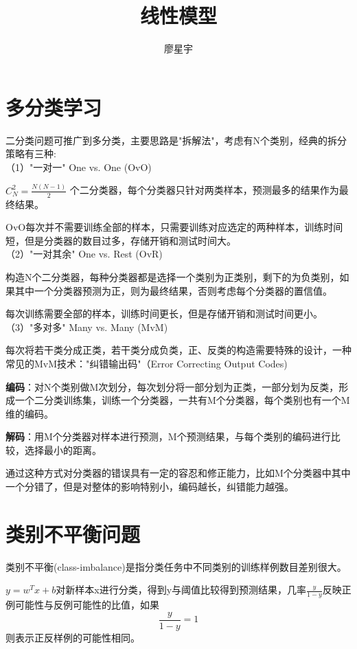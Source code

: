 \documentclass[UTF8]{article}
\author {廖星宇}
\title {线性模型}
\begin{document}
\maketitle
\section{多分类学习}

二分类问题可推广到多分类，主要思路是"拆解法"，考虑有N个类别，经典的拆分策略有三种:\\

（1）"一对一" One vs. One (OvO)

$C_{N}^{2} = \frac{N(N-1)}{2}$ 个二分类器，每个分类器只针对两类样本，预测最多的结果作为最终结果。

OvO每次并不需要训练全部的样本，只需要训练对应选定的两种样本，训练时间短，但是分类器的数目过多，存储开销和测试时间大。\\

（2）"一对其余" One vs. Rest (OvR)

构造N个二分类器，每种分类器都是选择一个类别为正类别，剩下的为负类别，如果其中一个分类器预测为正，则为最终结果，否则考虑每个分类器的置信值。

每次训练需要全部的样本，训练时间更长，但是存储开销和测试时间更小。\\

（3）"多对多" Many vs. Many (MvM)

每次将若干类分成正类，若干类分成负类，正、反类的构造需要特殊的设计，一种常见的MvM技术："纠错输出码"（Error Correcting Output Codes)

\textbf{编码}：对N个类别做M次划分，每次划分将一部分划为正类，一部分划为反类，形成一个二分类训练集，训练一个分类器，一共有M个分类器，每个类别也有一个M维的编码。

\textbf{解码}：用M个分类器对样本进行预测，M个预测结果，与每个类别的编码进行比较，选择最小的距离。

通过这种方式对分类器的错误具有一定的容忍和修正能力，比如M个分类器中其中一个分错了，但是对整体的影响特别小，编码越长，纠错能力越强。

\section{类别不平衡问题}
类别不平衡(class-imbalance)是指分类任务中不同类别的训练样例数目差别很大。

$y = w^{T}x + b$对新样本x进行分类，得到y与阈值比较得到预测结果，几率$\frac{y}{1-y}$反映正例可能性与反例可能性的比值，如果
$$\frac{y}{1-y} = 1$$
则表示正反样例的可能性相同。
\end{document}
